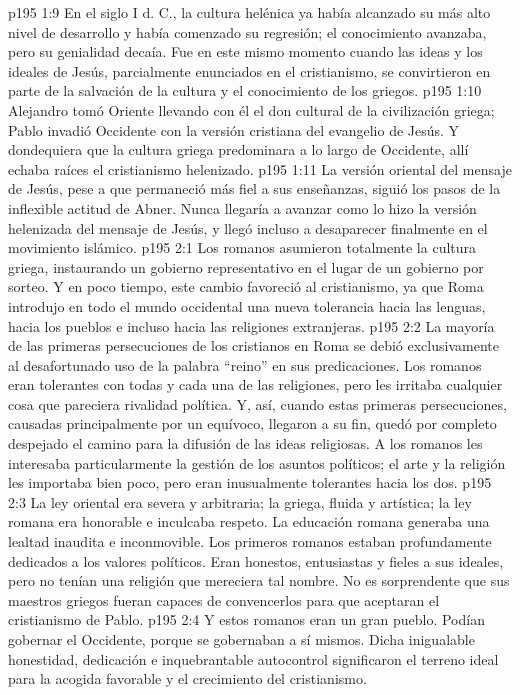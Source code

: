 \vs p195 1:9 En el siglo I d. C., la cultura helénica ya había alcanzado su más alto nivel de desarrollo y había comenzado su regresión; el conocimiento avanzaba, pero su genialidad decaía. Fue en este mismo momento cuando las ideas y los ideales de Jesús, parcialmente enunciados en el cristianismo, se convirtieron en parte de la salvación de la cultura y el conocimiento de los griegos.
\vs p195 1:10 Alejandro tomó Oriente llevando con él el don cultural de la civilización griega; Pablo invadió Occidente con la versión cristiana del evangelio de Jesús. Y dondequiera que la cultura griega predominara a lo largo de Occidente, allí echaba raíces el cristianismo helenizado.
\vs p195 1:11 \pc La versión oriental del mensaje de Jesús, pese a que permaneció más fiel a sus enseñanzas, siguió los pasos de la inflexible actitud de Abner. Nunca llegaría a avanzar como lo hizo la versión helenizada del mensaje de Jesús, y llegó incluso a desaparecer finalmente en el movimiento islámico.
\vs p195 2:1 Los romanos asumieron totalmente la cultura griega, instaurando un gobierno representativo en el lugar de un gobierno por sorteo. Y en poco tiempo, este cambio favoreció al cristianismo, ya que Roma introdujo en todo el mundo occidental una nueva tolerancia hacia las lenguas, hacia los pueblos e incluso hacia las religiones extranjeras.
\vs p195 2:2 La mayoría de las primeras persecuciones de los cristianos en Roma se debió exclusivamente al desafortunado uso de la palabra “reino” en sus predicaciones. Los romanos eran tolerantes con todas y cada una de las religiones, pero les irritaba cualquier cosa que pareciera rivalidad política. Y, así, cuando estas primeras persecuciones, causadas principalmente por un equívoco, llegaron a su fin, quedó por completo despejado el camino para la difusión de las ideas religiosas. A los romanos les interesaba particularmente la gestión de los asuntos políticos; el arte y la religión les importaba bien poco, pero eran inusualmente tolerantes hacia los dos.
\vs p195 2:3 La ley oriental era severa y arbitraria; la griega, fluida y artística; la ley romana era honorable e inculcaba respeto. La educación romana generaba una lealtad inaudita e inconmovible. Los primeros romanos estaban profundamente dedicados a los valores políticos. Eran honestos, entusiastas y fieles a sus ideales, pero no tenían una religión que mereciera tal nombre. No es sorprendente que sus maestros griegos fueran capaces de convencerlos para que aceptaran el cristianismo de Pablo.
\vs p195 2:4 Y estos romanos eran un gran pueblo. Podían gobernar el Occidente, porque se gobernaban a sí mismos. Dicha inigualable honestidad, dedicación e inquebrantable autocontrol significaron el terreno ideal para la acogida favorable y el crecimiento del cristianismo.
